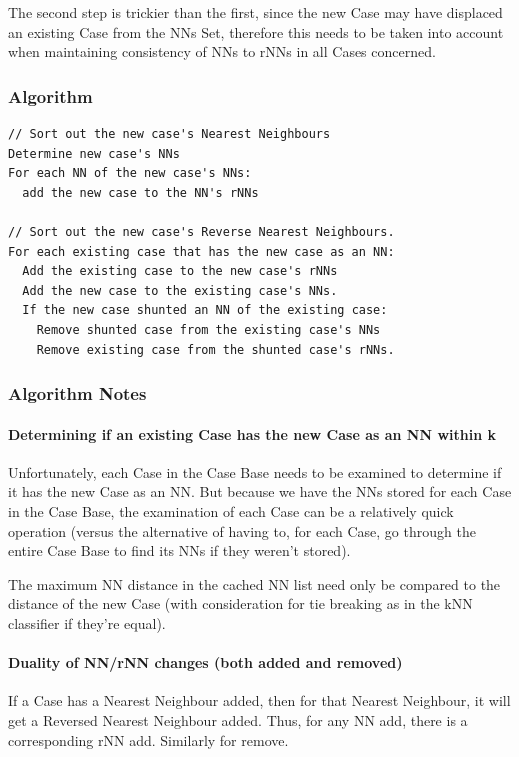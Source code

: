 \documentclass[a4paper,11pt]{report}
\begin{document}
The second step is trickier than the first, since the new Case may have displaced an existing Case from the NNs Set, therefore this needs to be taken into account when maintaining consistency of NNs to rNNs in all Cases concerned.

\begin{samepage}
\subsubsection{Algorithm}

{\small 
\begin{verbatim}
// Sort out the new case's Nearest Neighbours
Determine new case's NNs
For each NN of the new case's NNs:
  add the new case to the NN's rNNs

// Sort out the new case's Reverse Nearest Neighbours.
For each existing case that has the new case as an NN:
  Add the existing case to the new case's rNNs
  Add the new case to the existing case's NNs.
  If the new case shunted an NN of the existing case:
    Remove shunted case from the existing case's NNs
    Remove existing case from the shunted case's rNNs.
\end{verbatim}
}
\end{samepage}

\subsubsection{Algorithm Notes}
\paragraph{Determining if an existing Case has the new Case as an NN within k}
Unfortunately, each Case in the Case Base needs to be examined to determine if it has the new Case as an NN. But because we have the NNs stored for each Case in the Case Base, the examination of each Case can be a relatively quick operation (versus the alternative of having to, for each Case, go through the entire Case Base to find its NNs if they weren't stored).

The maximum NN distance in the cached NN list need only be compared to the distance of the new Case (with consideration for tie breaking as in the kNN classifier if they're equal).

\paragraph{Duality of NN/rNN changes (both added and removed)}
If a Case has a Nearest Neighbour added, then for that Nearest Neighbour, it will get a Reversed Nearest Neighbour added. Thus, for any NN add, there is a corresponding rNN add. Similarly for remove.
\end{document}
